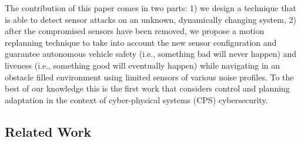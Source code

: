 The contribution of this paper comes in two parts: 1) we design a technique that is able to detect sensor attacks on an unknown, dynamically changing system, 2) after the compromised sensors have been removed, we propose a motion replanning technique to take into account the new sensor configuration and  guarantee autonomous vehicle safety (i.e., something bad will never happen) and liveness (i.e., something good will eventually happen) while navigating in an obstacle filled environment using limited sensors of various noise profiles. 
To the best of our knowledge this is the first work that considers control and planning adaptation in the context of cyber-physical systems (CPS) cybersecurity.






\subsection{Related Work}
\label{sec:Related Work}

